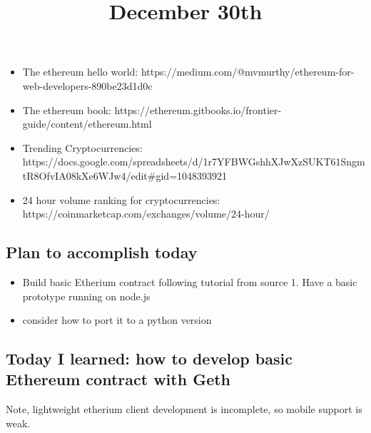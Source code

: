 \begin{itemize}
	\item The ethereum hello world: https://medium.com/@mvmurthy/ethereum-for-web-developers-890be23d1d0c
	\item The ethereum book: https://ethereum.gitbooks.io/frontier-guide/content/ethereum.html
	\item Trending Cryptocurrencies: https://docs.google.com/spreadsheets/d/1r7YFBWGshhXJwXzSUKT61SngmtR8OfvIA08kXe6WJw4/edit#gid=1048393921
	\item 24 hour volume ranking for cryptocurrencies: https://coinmarketcap.com/exchanges/volume/24-hour/
\end{itemize}	


\title{December 30th}

\subsection{Plan to accomplish today}

\begin{itemize}
	\item Build basic Etherium contract following tutorial from source 1. Have a basic prototype running on node.js
	\item consider how to port it to a python version
\end{itemize}

\subsection{Today I learned: how to develop basic Ethereum contract with Geth}

Note, lightweight etherium client development is incomplete, so mobile support is weak.


